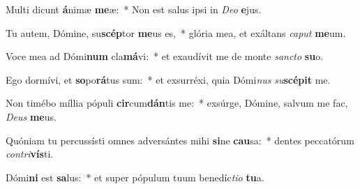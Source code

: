 \item Multi dicunt \textbf{á}nimæ \textbf{me}æ:~* Non est salus ipsi in \textit{De}\textit{o} \textbf{e}jus.
\item Tu autem, Dómine, su\textbf{scép}tor \textbf{me}us es,~* glória mea, et exáltans \textit{ca}\textit{put} \textbf{me}um.
\item Voce mea ad Dómi\textbf{num} cla\textbf{má}vi:~* et exaudívit me de monte \textit{sanc}\textit{to} \textbf{su}o.
\item Ego dormívi, et \textbf{so}po\textbf{rá}tus sum:~* et exsurréxi, quia Dómi\textit{nus} \textit{su}\textbf{scé}\textbf{pit} me.
\item Non timébo míllia pópuli \textbf{cir}cum\textbf{dán}tis me:~* exsúrge, Dómine, salvum me fac, \textit{De}\textit{us} \textbf{me}us.
\item Quóniam tu percussísti omnes adversántes mihi \textbf{si}ne \textbf{cau}sa:~* dentes peccatórum \textit{con}\textit{tri}\textbf{vís}ti.
\item Dómi\textbf{ni} est \textbf{sa}lus:~* et super pópulum tuum benedíc\textit{ti}\textit{o} \textbf{tu}a.

